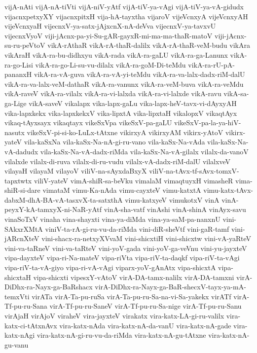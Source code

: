 {vijA-nAti
vijA-nA-tiVti
vijA-niV-yAtf
vijA-tiV-ya-vAgi
vijA-tiV-ya-vA-gidudx
vijacnxpetxyXY
vijacnxpitxH
vija-hA-tayxtha
vijaroV
vijeVcnxyA
vijeVcnxyAH
vijeVcnxyaH
vijecnxV-ya-satx-jAjxcnX-nA-deVva
vijecnxV-ya-tavxvU
vijecnxVyoV
viji-jAcnx-pa-yi-Su-gAR-gayxR-mi-ma-ma-thaR-matoV
viji-jAcnx-su-ru-peVtoV
vikA-rAthaR
vikA-rA-thaR-dalilx
vikA-rA-thaR-veM-budu
vikAra
vikAraH
vikA-ra-bu-didhxyu
vikA-rada
vikA-ra-gaLU
vikA-ra-ga-Lanunx
vikA-ra-go-Lisi
vikA-ra-go-Li-su-vu-dilalx
vikA-ra-goM-Di-teMdu
vikA-ra-rU-pA-pananxH
vikA-ra-vA-guva
vikA-ra-vA-yi-teMdu
vikA-ra-va-lalx-dadx-riM-dalU
vikA-ra-va-lalx-veM-dathaR
vikA-ra-vanunx
vikA-ra-veM-buva
vikA-ra-veMdu
vikA-raveV
vikA-ra-vilalx
vikA-ra-vi-lalxda
vikA-ra-vi-lalxde
vikA-ravu
vikA-sa-ga-Lige
vikA-saveV
vikalapx
vika-lapx-gaLu
vika-lapx-heV-tavx-vi-dAyxyAH
vika-lapxkekx
vika-lapxkekxV
vika-lipxtA
vika-lipxtaH
vikalopxV
vikaqtAyx
vikaq-tAyxsayx
vikaqtayx
vikeSxVpa
vikeSxV-pa-gaLU
vikeSxV-pa-la-ya-hiV-nasutx
vikeSxV-pi-si-ko-LuLx-tAtxne
vikirxyA
vikirxyAM
vikirx-yAtoV
vikirx-yateV
vila-kaSxNa
vila-kaSx-Na-nA-gi-ru-vano
vila-kaSx-Na-vAda
vila-kaSx-Na-vA-dadudx
vila-kaSx-Na-vA-dadx-riMda
vila-kaSx-Na-vA-gilalx
vilalx-da-vanoV
vilalxde
vilalx-di-ruva
vilalx-di-ru-vudu
vilalx-vA-dadx-riM-dalU
vilalxveV
vilayaH
vilayaM
vilayoV
viliV-na-sAyxdaBxyX
viliV-na-tAvx-tf-sAvx-tomxV-tapxtwtx
viliV-yateV
vimA-shiR-sa-beVku
vimalaM
vimaqtuyxH
vimasheR
vima-shiR-si-dare
vimataM
vimu-Ka-nAda
vimu-cayxteV
vimu-katxtA
vimu-katx-tAvx-dabxM-dhA-BA-vA-tasxvX-ta-satxthA
vimu-katxyeV
vimukotxV
vinA
vinA-peyxY-kA-tamxyX-ni-NaR-yAtf
vinA-sha-vatf
vinAshi
vinA-shinA
vinAyx-savu
vinaSoTxV
vinaha
vina-shayxti
vina-ya-diMda
vina-ya-saM-pa-nanxnU
vini-SAkxrXMtA
viniV-ta-rA-gi-ru-vu-da-riMda
vini-diR-sheVtf
vini-gaR-tamf
vini-jARcnXteV
vini-shacx-ra-netxyXVvaM
vini-shicxtiH
vini-shicxtw
vini-vA-yaRteV
vini-va-taRneV
vini-va-taRteV
vini-yoV-gada
vini-yoV-ga-veVnu
vini-yu-jayxteV
vipa-dayxteV
vipa-ri-Na-mateV
vipa-riVta
vipa-riV-ta-daqkf
vipa-riV-ta-vAgi
vipa-riV-ta-vA-giyo
vipa-ri-vA-vAgi
viparx-yoV-gAnAtx
vipa-shicxtA
vipa-shicxtaH
vipa-shicxti
vipesxY-vAtoV
virA-DA-tamx-nalilx
virA-DA-tamxni
virA-DiDhx-ra-Nayx-ga-BaRshacx
virA-DiDhx-ra-Nayx-ga-BaR-shecxV-tayx-ya-mA-temxVti
virATa
virA-Ta-pu-ruSa
virA-Ta-pu-ru-Sa-na-vi-Sa-yakekx
virATf
virA-Tf-pu-ru-Sana
virA-Tf-pu-ru-SaneV
virA-Tf-pu-ru-Sa-nige
virA-Tf-pu-ru-Sanu
virAjaH
virAjoV
viraheV
vira-jayxteV
virakatx
vira-katx-LA-gi-ru-valilx
vira-katx-ci-tAtxnAvx
vira-katx-nAda
vira-katx-nA-da-vanU
vira-katx-nA-gade
vira-katx-nAgi
vira-katx-nA-gi-ru-vu-da-riMda
vira-katx-nA-gu-tAtxne
vira-katx-nA-gu-vanu
}
